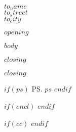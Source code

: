 \documentclass[$fontsize$,a4paper]{dinbrief}
\begin{document}
\subject{\textbf{$subject$}}

\begin{letter}{
\textsf{$to_name$ \\
$to_street$ \\[\medskipamount]
$to_city$}}

\opening{$opening$}

$body$


{
    \closing[{\texttt{[image: \$signature\$]}}]{$closing$}
}
{
    \closing[]{$closing$}
}

$if(ps)$
\ps{$ps$}
$endif$

$if(encl)$
$endif$

$if(cc)$
$endif$

\end{letter}
\end{document}
